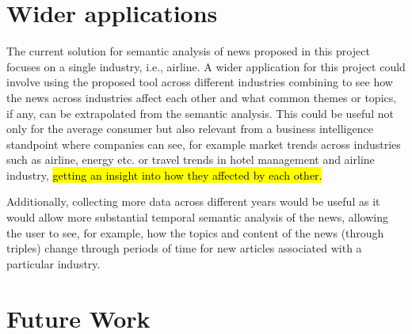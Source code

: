 

\section{Wider applications}
The current solution for semantic analysis of news proposed in this project focuses on a single industry, i.e., airline. A wider application for this project could involve using the proposed tool across different industries combining to see how the news across industries affect each other and what common themes or topics, if any, can be extrapolated from the semantic analysis. This could be useful not only for the average consumer but also relevant from a business intelligence standpoint where companies can see, for example market trends across industries such as airline, energy etc. or travel trends in hotel management and airline industry, \hl{getting an insight into how they affected by each other. }

Additionally, collecting more data across different years would be useful as it would allow more substantial temporal semantic analysis of the news, allowing the user to see, for example, how the topics and content of the news (through triples) change through periods of time for new articles associated with a particular industry. 



\section{Future Work}

